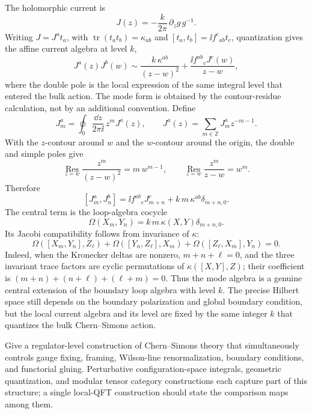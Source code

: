The holomorphic current is
\[
  J(z)=-\frac{k}{2\pi}\,\partial_zg\,g^{-1}.
\]
Writing \(J=J^at_a\), with
\(\operatorname{tr}(t_at_b)=\kappa_{ab}\) and
\([t_a,t_b]=\ii f^c{}_{ab}t_c\), quantization gives the affine current
algebra at level \(k\),
\[
  J^a(z)J^b(w)
  \sim
  \frac{k\,\kappa^{ab}}{(z-w)^2}
  +
  \frac{\ii f^{ab}{}_{c}J^c(w)}{z-w},
\]
where the double pole is the local expression of the same integral level that
entered the bulk action.  The mode form is obtained by the contour-residue
calculation, not by an additional convention.  Define
\[
  J_m^a=\oint_0\frac{\dd z}{2\pi\ii}\,z^mJ^a(z),
  \qquad
  J^a(z)=\sum_{m\in\mathbb Z}J_m^a z^{-m-1}.
\]
With the \(z\)-contour around \(w\) and the \(w\)-contour around the origin,
the double and simple poles give
\[
  \operatorname*{Res}_{z=w}\frac{z^m}{(z-w)^2}
  =
  m\,w^{m-1},
  \qquad
  \operatorname*{Res}_{z=w}\frac{z^m}{z-w}=w^m .
\]
Therefore
\[
  [J_m^a,J_n^b]
  =
  \ii f^{ab}{}_{c}J_{m+n}^c
  +
  k\,m\,\kappa^{ab}\delta_{m+n,0}.
\]
The central term is the loop-algebra cocycle
\[
  \Omega(X_m,Y_n)=k\,m\,\kappa(X,Y)\delta_{m+n,0}.
\]
Its Jacobi compatibility follows from invariance of \(\kappa\):
\[
  \Omega([X_m,Y_n],Z_\ell)
  +\Omega([Y_n,Z_\ell],X_m)
  +\Omega([Z_\ell,X_m],Y_n)=0 .
\]
Indeed, when the Kronecker deltas are nonzero, \(m+n+\ell=0\), and the three
invariant trace factors are cyclic permutations of
\(\kappa([X,Y],Z)\); their coefficient is
\((m+n)+(n+\ell)+(\ell+m)=0\).  Thus the mode algebra is a genuine central
extension of the boundary loop algebra with level \(k\).
The precise Hilbert space still depends on the boundary polarization and
global boundary condition, but the local current algebra and its level are
fixed by the same integer \(k\) that quantizes the bulk Chern--Simons action.

\begin{openproblem}
\label{op:chern-simons-qft-object}
Give a regulator-level construction of Chern--Simons theory that simultaneously
controls gauge fixing, framing, Wilson-line renormalization, boundary
conditions, and functorial gluing.  Perturbative configuration-space
integrals, geometric quantization, and modular tensor category constructions
each capture part of this structure; a single local-QFT construction should
state the comparison maps among them.
\end{openproblem}
